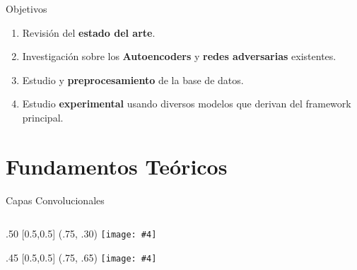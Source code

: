 \documentclass[aspectratio=43]{beamer}
\renewcommand{\cite}[1]{\footnote<.->[frame]{\fullcite{#1}}}
\newcommand{\absimage}[4][0.5,0.5]{%
	\begin{textblock}{#3}%
		[#1]%
		(#2)%
		\texttt{[image: \#4]}%
\end{textblock}}
\begin{document}
\begin{frame}{Objetivos}
  \begin{enumerate}
    \item Revisión del \textbf{estado del arte}.
    \item Investigación sobre los \textbf{Autoencoders} y \textbf{redes adversarias} existentes.
    \item Estudio y \textbf{preprocesamiento} de la base de datos.
    \item Estudio \textbf{experimental} usando diversos modelos que derivan del framework principal.
  \end{enumerate}
\end{frame}

\section{Fundamentos Teóricos}



\begin{frame}{Capas Convolucionales}
  \begin{columns}[onlytextwidth]
    \begin{column}{.5\textwidth}
      \absimage{.75, .30}{.50}{imgs/mapa_activacion.png}
      \absimage{.75, .65}{.45}{imgs/sucesion_conv_layer.png}
    \end{column}
  \end{columns}
\end{frame}
\end{document}
